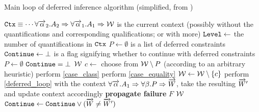 \begin{algorithm}
    \caption{Main loop of deferred inference algorithm (simplified, from \citet{peytonjones2019type})}
    \label{deferred_loop}
    \begin{algorithmic}
        \Require $\mathtt{Ctx} \equiv \cdots \forall \overrightarrow{\alpha}_2 . A_2 \Rightarrow \forall \overrightarrow{\alpha}_1 . A_1 \Rightarrow \mathcal W$ is the current context (possibly without the quantifications and corresponding qualifications; or with more)
        \State {}
        \State $\mathtt{Level} \gets$ the number of quantifications in $\mathtt{Ctx}$
        \State $P \gets \emptyset$ is a list of deferred constraints
        \State $\mathtt{Continue} \gets \bot$ is a flag signifying whether to continue with deferred constraints
         
             
                 
                    \State $P \gets \emptyset$
                    \State $\mathtt{Continue} = \bot$
                \Else
                    \State \Return $\mathcal W$ 
                \EndIf
            \EndIf
            \State $c \gets $ choose from $\mathcal W \setminus P$ (according to an arbitrary heuristic)
                \State perform \cref{case_class}
                \State perform \cref{case_equality}
                    \State $\mathcal W \gets \mathcal W \setminus \{c\}$ 
                \Else
                    \State perform \cref{deferred_loop} with the context $\forall \overrightarrow{\alpha} . A_1 \Rightarrow \forall \beta . P \Rightarrow \overrightarrow{W}$, take the resulting $\overrightarrow{W}'$ and update context accordingly
                        \State \textbf{propagate failure} $F$
                        \State \Return $\mathcal W$
                    \EndIf
                    \State $\mathtt{Continue} \gets \mathtt{Continue} \lor (\overrightarrow{W} \neq \overrightarrow{W}')$
                \EndIf
            \EndIf
        \EndWhile
    \end{algorithmic}
\end{algorithm}
